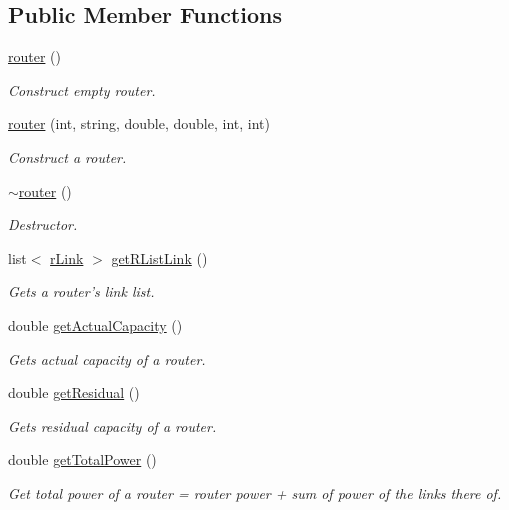 \subsection*{\-Public \-Member \-Functions}
\begin{DoxyCompactItemize}
\item 
\hyperlink{classrouter_af5559739f6e4f9b1c7f7bf80e32f6cd9}{router} ()
\begin{DoxyCompactList}\small\item\em \-Construct empty router. \end{DoxyCompactList}\item 
\hyperlink{classrouter_a43d7888550284a3bffff71abf6c087eb}{router} (int, string, double, double, int, int)
\begin{DoxyCompactList}\small\item\em \-Construct a router. \end{DoxyCompactList}\item 
\hyperlink{classrouter_a64870f29b48d6ee6276ec27b1b18e189}{$\sim$router} ()
\begin{DoxyCompactList}\small\item\em \-Destructor. \end{DoxyCompactList}\item 
list$<$ \hyperlink{classrLink}{r\-Link} $>$ \hyperlink{classrouter_a36115bd5923217c64922b2231f05c304}{get\-R\-List\-Link} ()
\begin{DoxyCompactList}\small\item\em \-Gets a router's link list. \end{DoxyCompactList}\item 
double \hyperlink{classrouter_a0c1d4a7689e992d90b0fcbf4a958c8b4}{get\-Actual\-Capacity} ()
\begin{DoxyCompactList}\small\item\em \-Gets actual capacity of a router. \end{DoxyCompactList}\item 
double \hyperlink{classrouter_a7d5187977fd2dbf2fa562d3953647699}{get\-Residual} ()
\begin{DoxyCompactList}\small\item\em \-Gets residual capacity of a router. \end{DoxyCompactList}\item 
double \hyperlink{classrouter_a425b6d8372b0951a77097d0e6b49914a}{get\-Total\-Power} ()
\begin{DoxyCompactList}\small\item\em \-Get total power of a router = router power + sum of power of the links there of. \end{DoxyCompactList}\item 

\end{DoxyCompactItemize}
